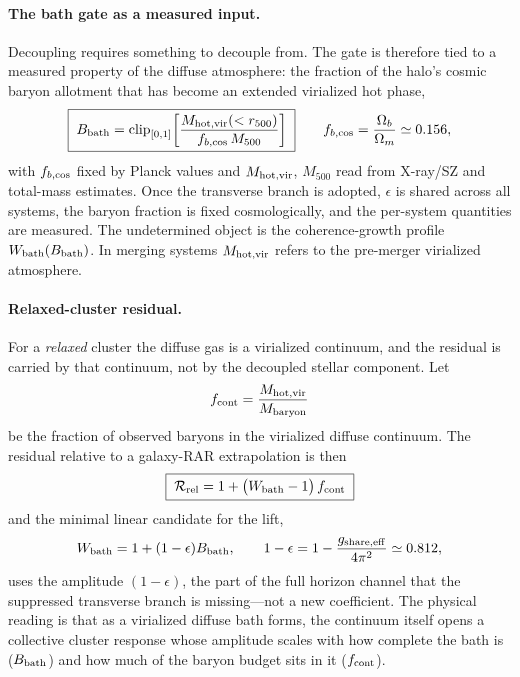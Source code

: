 \documentclass[11pt]{article}
\begin{document}
\paragraph{The bath gate as a measured input.}
Decoupling requires something to decouple from. The gate is therefore tied to a measured property of the diffuse atmosphere: the fraction of the halo's cosmic baryon allotment that has become an extended virialized hot phase,
\[
\boxed{\;
B_{\rm bath}
=
\mathrm{clip}_{[0,1]}\!\left[
\frac{M_{\rm hot,vir}(<r_{500})}{f_{b,\rm cos}\,M_{500}}
\right]\;}
\qquad
f_{b,\rm cos}=\frac{\Omega_b}{\Omega_m}\simeq 0.156 ,
\]
with $f_{b,\rm cos}$ fixed by Planck values \citep{Planck2020} and $M_{\rm hot,vir}$, $M_{500}$ read from X-ray/SZ and total-mass estimates. Once the transverse branch is adopted, $\epsilon$ is shared across all systems, the baryon fraction is fixed cosmologically, and the per-system quantities are measured. The undetermined object is the coherence-growth profile $W_{\rm bath}(B_{\rm bath})$. In merging systems $M_{\rm hot,vir}$ refers to the pre-merger virialized atmosphere.

\paragraph{Relaxed-cluster residual.}
For a \emph{relaxed} cluster the diffuse gas is a virialized continuum, and the residual is carried by that continuum, not by the decoupled stellar component. Let
\[
f_{\rm cont}=\frac{M_{\rm hot,vir}}{M_{\rm baryon}}
\]
be the fraction of observed baryons in the virialized diffuse continuum. The residual relative to a galaxy-RAR extrapolation is then
\[
\boxed{\;
\mathcal R_{\rm rel}
=
1+\big(W_{\rm bath}-1\big)\,f_{\rm cont}\;}
\]
and the minimal linear candidate for the lift,
\[
W_{\rm bath}=1+(1-\epsilon)B_{\rm bath},
\qquad
1-\epsilon=1-\frac{g_{\mathrm{share,eff}}}{4\pi^2}\simeq 0.812 ,
\]
uses the amplitude $(1-\epsilon)$, the part of the full horizon channel that the suppressed transverse branch is missing---not a new coefficient. The physical reading is that as a virialized diffuse bath forms, the continuum itself opens a collective cluster response whose amplitude scales with how complete the bath is ($B_{\rm bath}$) and how much of the baryon budget sits in it ($f_{\rm cont}$).
\end{document}
